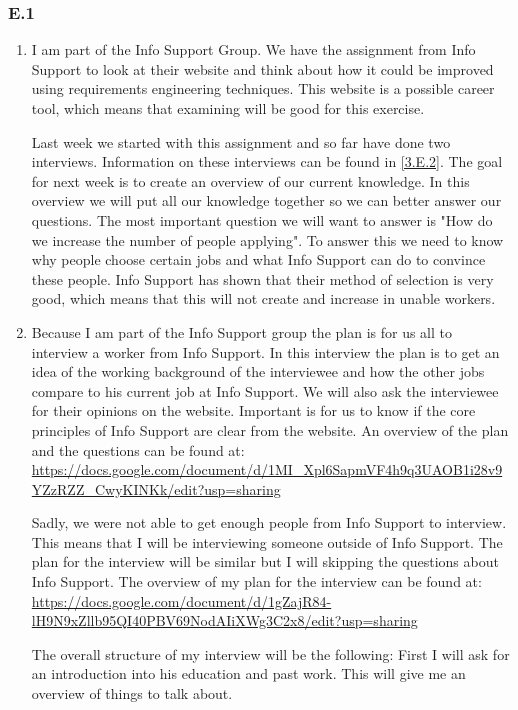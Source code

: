 \documentclass[]{article}
\begin{document}
\subsubsection*{E.1} 
\begin{enumerate}[a]
    \item I am part of the Info Support Group. We have the assignment from Info 
    Support to look at their website and think about how it could be improved 
    using requirements engineering techniques. This website is a possible career
    tool, which means that examining will be good for this exercise. 

    Last week we started with this assignment and so far have done two interviews.
    Information on these interviews can be found in \autoref{3.E.2}. 
    The goal for next week is to create an overview of our current knowledge.
    In this overview we will put all our knowledge together so we can better 
    answer our questions. The most important question we will want to answer 
    is "How do we increase the number of people applying". To answer this we 
    need to know why people choose certain jobs and what Info Support can do 
    to convince these people. Info Support has shown that their method of 
    selection is very good, which means that this will not create and increase 
    in unable workers.

    \item Because I am part of the Info Support group the plan is for us all to 
    interview a worker from Info Support. In this interview the plan is to get an 
    idea of the working background of the interviewee and how the other jobs 
    compare to his current job at Info Support. We will also ask the interviewee 
    for their opinions on the website. Important is for us to know if the core 
    principles of Info Support are clear from the website. An overview of the 
    plan and the questions can be found at: \url{https://docs.google.com/document/d/1MI_Xpl6SapmVF4h9q3UAOB1i28v9YZzRZZ_CwyKINKk/edit?usp=sharing}

    Sadly, we were not able to get enough people from Info Support to interview. 
    This means that I will be interviewing someone outside of Info Support. The 
    plan for the interview will be similar but I will skipping the questions 
    about Info Support. The overview of my plan for the interview can be found 
    at: \url{https://docs.google.com/document/d/1gZajR84-lH9N9xZllb95QI40PBV69NodAIiXWg3C2x8/edit?usp=sharing}

    The overall structure of my interview will be the following: First I will 
    ask for an introduction into his education and past work. This will 
    give me an overview of things to talk about. 


\end{enumerate}
\end{document}
